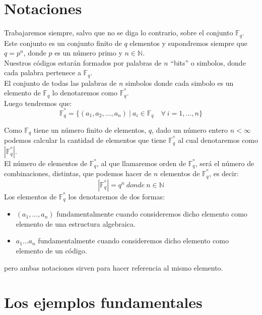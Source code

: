 \section{Notaciones}

Trabajaremos siempre, salvo que no se diga lo contrario, sobre el conjunto
$\mathbb{F}_q$. Este conjunto es un conjunto finito de $q$ elementos y
supondremos siempre que $q=p^n$, donde $p$ es un n\'umero primo y $n\in
\mathbb{N}$.\\

Nuestros c\'odigos estar\'an formados por palabras de $n$ ``bits'' o simbolos,
donde cada palabra pertenece a $\mathbb{F}_q$.\\

El conjunto de todas las palabras de $n$ simbolos donde cada simbolo es un
elemento de $\mathbb{F}_q$ lo denotaremos como $\mathbb{F}^{^n}_q$.\\

Luego tendremos que:
\begin{displaymath}
\mathbb{F}^{^n}_q = \{(a_1,a_2,\dots,a_n)\ |\ a_i\in \mathbb{F}_q\quad \forall \
i=1,\dots,n\}
\end{displaymath}

Como $\mathbb{F}_q$ tiene un n\'umero finito de elementos, $q$, dado un n\'umero
entero $n<\infty$ podemos calcular la cantidad de elementos que tiene
$\mathbb{F}^{^n}_q$ al cual denotaremos como $|\mathbb{F}^{^n}_q|$.\\

El n\'umero de elementos de $\mathbb{F}^{^n}_q$, al que llamaremos orden de
$\mathbb{F}^{^n}_q$, ser\'a el n\'umero de combinaciones, distintas, que podemos
hacer de $n$ elementos de $\mathbb{F}^{^n}_q$, es decir:
\begin{displaymath}
|\mathbb{F}^{^n}_q| = q^n\ donde\ n\in \mathbb{N}
\end{displaymath}
%
Los elementos de $\mathbb{F}^{^n}_q$ los denotaremos de dos formas:
\begin{itemize}
\item $(a_1,\dots,a_n)$ fundamentalmente cuando consideremos dicho elemento como
elemento de una estructura algebraica.
\item $a_1\dots a_n$ fundamentalmente cuando consideremos dicho elemento como
elemento de un c\'odigo.
\end{itemize}
pero ambas notaciones sirven para hacer referencia al mismo elemento.

\section{Los ejemplos fundamentales}

